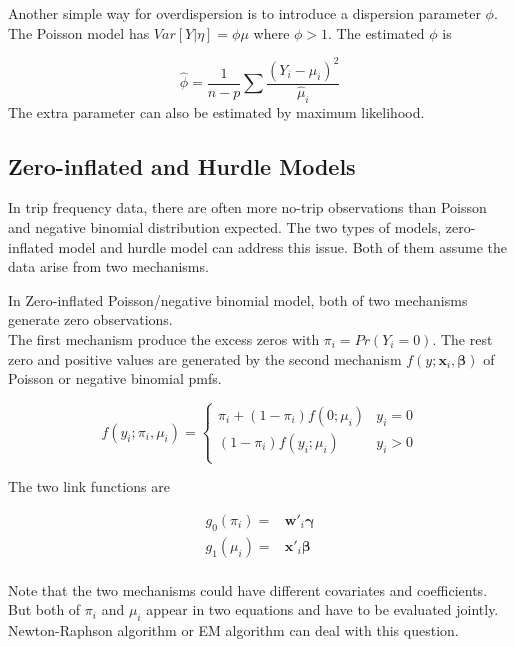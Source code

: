 \documentclass[
  11pt,
  openany]{memoir}
\begin{document}
Another simple way for overdispersion is to introduce a dispersion parameter \(\phi\). The Poisson model has \(Var[Y|\eta]=\phi\mu\) where \(\phi>1\). The estimated \(\phi\) is

\[
\hat\phi=\frac{1}{n-p}\sum\frac{(Y_i-\hat\mu_i)^2}{\hat\mu_i}
\]
The extra parameter can also be estimated by maximum likelihood.

\hypertarget{zero-inflated-and-hurdle-models}{%
\subsection{Zero-inflated and Hurdle Models}\label{zero-inflated-and-hurdle-models}}

In trip frequency data, there are often more no-trip observations than Poisson and negative binomial distribution expected. The two types of models, zero-inflated model and hurdle model can address this issue.
Both of them assume the data arise from two mechanisms.

In Zero-inflated Poisson/negative binomial model, both of two mechanisms generate zero observations.\\
The first mechanism produce the excess zeros with \(\pi_i=Pr(Y_i=0)\). The rest zero and positive values are generated by the second mechanism \(f(y;\mathbf{x}_i,\boldsymbol\beta)\) of Poisson or negative binomial pmfs.

\begin{equation}
f(y_i;\pi_i,\mu_i)=\begin{cases}\pi_i+(1-\pi_i)f(0;\mu_i)&y_i=0\\
(1-\pi_i)f(y_i;\mu_i)&y_i>0\\
\end{cases}
\label{eq:zi}
\end{equation}

The two link functions are

\begin{equation}
\begin{split}
g_0(\pi_i)=&\mathbf{w}'_i\boldsymbol\gamma\\
g_1(\mu_i)=&\mathbf{x}'_i\boldsymbol\beta\\
\end{split}
\end{equation}

Note that the two mechanisms could have different covariates and coefficients.
But both of \(\pi_i\) and \(\mu_i\) appear in two equations and have to be evaluated jointly. Newton-Raphson algorithm or EM algorithm can deal with this question.
\end{document}
